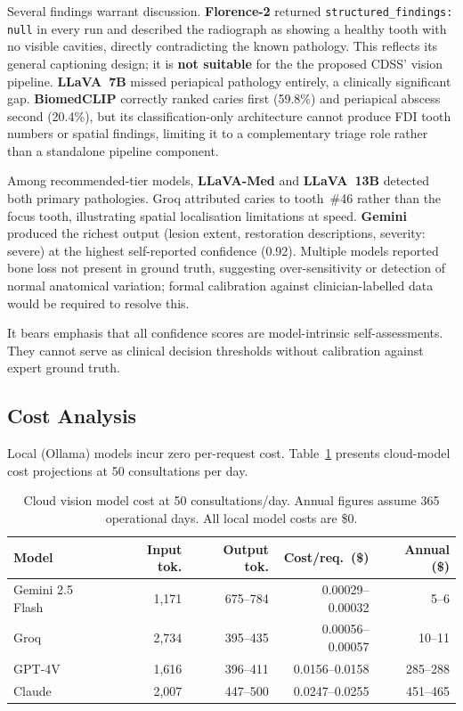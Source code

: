 \documentclass[12pt,a4paper]{report}
\begin{document}
	Several findings warrant discussion. \textbf{Florence-2} returned
	\texttt{structured\_findings: null} in every run and described the radiograph as
	showing a healthy tooth with no visible cavities, directly contradicting the
	known pathology. This reflects its general captioning design; it is \textbf{not
		suitable} for the the proposed CDSS' vision pipeline. \textbf{LLaVA~7B} missed periapical
	pathology entirely, a clinically significant gap. \textbf{BiomedCLIP} correctly
	ranked caries first (59.8\%) and periapical abscess second (20.4\%), but its
	classification-only architecture cannot produce FDI tooth numbers or spatial
	findings, limiting it to a complementary triage role rather than a standalone
	pipeline component.
	
	Among recommended-tier models, \textbf{LLaVA-Med} and \textbf{LLaVA~13B}
	detected both primary pathologies. Groq attributed caries to tooth~\#46 rather
	than the focus tooth, illustrating spatial localisation limitations at speed.
	\textbf{Gemini} produced the richest output (lesion extent, restoration
	descriptions, severity: severe) at the highest self-reported confidence (0.92).
	Multiple models reported bone loss not present in ground truth, suggesting
	over-sensitivity or detection of normal anatomical variation; formal calibration
	against clinician-labelled data would be required to resolve this.
	
	It bears emphasis that all confidence scores are model-intrinsic self-assessments.
	They cannot serve as clinical decision thresholds without calibration against
	expert ground truth.
	
	\subsection{Cost Analysis}
	\label{subsec:results_cost_vision}
	
	Local (Ollama) models incur zero per-request cost. Table~\ref{tab:cost_vision}
	presents cloud-model cost projections at 50 consultations per day.
	
	\begin{table}[H]
		\centering
		\caption{Cloud vision model cost at 50 consultations/day.
			Annual figures assume 365 operational days. All local model costs are \$0.}
		\label{tab:cost_vision}
		\small
		\renewcommand{\arraystretch}{1.2}
		\begin{tabularx}{\textwidth}{@{}l r r r r@{}}
			\toprule
			\textbf{Model} & \textbf{Input tok.} & \textbf{Output tok.} & \textbf{Cost/req.\ (\$)} & \textbf{Annual (\$)} \\
			\midrule
			Gemini 2.5 Flash & 1{,}171 & 675--784 & 0.00029--0.00032 &   5--6 \\
			Groq             & 2{,}734 & 395--435 & 0.00056--0.00057 & 10--11 \\
			GPT-4V           & 1{,}616 & 396--411 & 0.0156--0.0158   & 285--288 \\
			Claude           & 2{,}007 & 447--500 & 0.0247--0.0255   & 451--465 \\
			\bottomrule
		\end{tabularx}
	\end{table}
	
\end{document}
